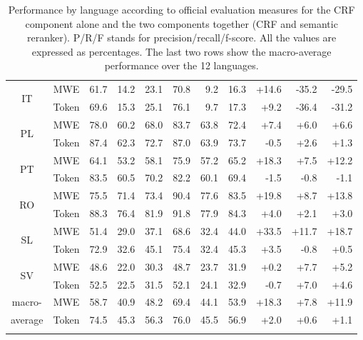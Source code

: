 \documentclass[output=paper
,modfonts
,nonflat]{langsci/langscibook}
\begin{document}
\begin{table}
{\begin{tabular}{ccrrrrrrrrr}
    \multirow{2}{*}{IT}&   MWE & 61.7 & 14.2 & 23.1 &      70.8  &      9.2  &     16.3 &    +14.6 &   -35.2 &   -29.5\\
    & Token & 69.6 & 15.3 & 25.1 &      76.1  &      9.7  &     17.3 &     +9.2 &   -36.4 &   -31.2\\
    \multirow{2}{*}{PL}&   MWE&  78.0 & 60.2 & 68.0 &      83.7  &     63.8  &     72.4 &     +7.4 &     +6.0 &     +6.6\\
    & Token&  87.4 & 62.3 & 72.7 &      87.0  &     63.9  &     73.7 &    -0.5 &     +2.6 &     +1.3\\
    \multirow{2}{*}{PT}&   MWE&  64.1 & 53.2 & 58.1 &      75.9  &     57.2  &     65.2 &    +18.3 &     +7.5 &    +12.2\\
    & Token&  83.5 & 60.5 & 70.2 &      82.2  &     60.1  &     69.4 &    -1.5 &    -0.8 &    -1.1\\
    \multirow{2}{*}{RO}&   MWE&  75.5 & 71.4 & 73.4 &      90.4  &     77.6  &     83.5 &    +19.8  &    +8.7 &    +13.8\\
    & Token&  88.3 & 76.4 & 81.9 &      91.8  &     77.9  &     84.3 &     +4.0 &     +2.1 &     +3.0\\
    \multirow{2}{*}{SL}&   MWE&  51.4 & 29.0 & 37.1 &      68.6  &     32.4  &     44.0 &    +33.5 &    +11.7 &    +18.7\\
    & Token&  72.9 & 32.6 & 45.1 &      75.4  &     32.4  &     45.3 &     +3.5 &    -0.8 &     +0.5\\
    \multirow{2}{*}{SV}&   MWE&  48.6 & 22.0 & 30.3 &      48.7  &     23.7  &     31.9 &     +0.2 &     +7.7 &     +5.2\\
    & Token&  52.5 & 22.5 & 31.5 &      52.1  &     24.1  &     32.9 &    -0.7 &     +7.0 &     +4.6\\
  \midrule
 {\scriptsize macro-}&   MWE&  58.7 & 40.9 & 48.2 &      69.4  &     44.1  &     53.9 &    +18.3 &     +7.8 &    +11.9\\
{\scriptsize average} & Token&  74.5 & 45.3 & 56.3 &      76.0  &     45.5  &     56.9 &     +2.0 &     +0.6 &     +1.1\\
\lspbottomrule
  \end{tabular}
}
\caption{{ Performance by language according to official evaluation
    measures for the CRF component alone and the two components
    together (CRF and semantic reranker).} P/R/F stands for precision/recall/f-score. All the
  values are expressed as percentages. The last two rows show the
  macro-average performance over the 12
  languages.\label{tab:perfByLang}}
\end{table}
\end{document}
